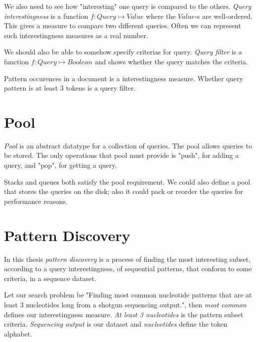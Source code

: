 We also need to see how "interesting" one query is compared to the others. \emph{Query interestingness} is a function $f: Query \mapsto Value$ where the $Value$-s are well-ordered. This gives a measure to compare two different queries. Often we can represent such interestingness measures as a real number.

We should also be able to somehow specify criterias for query. \emph{Query filter} is a function $f: Query \mapsto Boolean$ and shows whether the query matches the criteria.

\begin{exmp}
Pattern occurences in a document is a interestingness measure. Whether query pattern is at least 3 tokens is a query filter.
\end{exmp}

\section{Pool}

\emph{Pool} is an abstract datatype for a collection of queries. The pool allows queries to be stored. The only operations that pool must provide is "push", for adding a query, and "pop", for getting a query.

\begin{exmp}
Stacks and queues both satisfy the pool requirement. We could also define a pool that stores the queries on the disk; also it could pack or reorder the queries for performance reasons.
\end{exmp}

\section{Pattern Discovery}

In this thesis \emph{pattern discovery} is a process of finding the most interesting subset, according to a query interestingness, of sequential patterns, that conform to some criteria, in a sequence dataset.

\begin{exmp}
Let our search problem be "Finding most common nucleotide patterns that are at least 3 nucleotides long from a shotgun sequencing output.", then \emph{most common} defines our interestingness measure. \emph{At least 3 nucleotides} is the pattern subset criteria. \emph{Sequencing output} is our dataset and \emph{nucleotides} define the token alphabet.
\end{exmp}